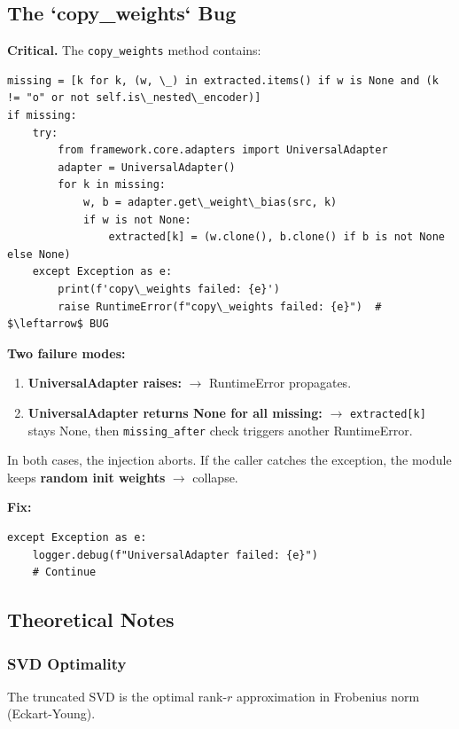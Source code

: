 \subsection{The `copy\_weights` Bug}

\textbf{Critical.} The \texttt{copy\_weights} method contains:

\begin{lstlisting}
missing = [k for k, (w, \_) in extracted.items() if w is None and (k != "o" or not self.is\_nested\_encoder)]
if missing:
    try:
        from framework.core.adapters import UniversalAdapter
        adapter = UniversalAdapter()
        for k in missing:
            w, b = adapter.get\_weight\_bias(src, k)
            if w is not None:
                extracted[k] = (w.clone(), b.clone() if b is not None else None)
    except Exception as e:
        print(f'copy\_weights failed: {e}')
        raise RuntimeError(f"copy\_weights failed: {e}")  # $\leftarrow$ BUG
\end{lstlisting}

\textbf{Two failure modes:}

\begin{enumerate}
\item \textbf{UniversalAdapter raises:} $\to$ RuntimeError propagates.
\item \textbf{UniversalAdapter returns None for all missing:} $\to$ \texttt{extracted[k]} stays None, then \texttt{missing\_after} check triggers another RuntimeError.

\end{enumerate}
In both cases, the injection aborts. If the caller catches the exception, 
the module keeps \textbf{random init weights} $\to$ collapse.

\textbf{Fix:}

\begin{lstlisting}
except Exception as e:
    logger.debug(f"UniversalAdapter failed: {e}")
    # Continue
\end{lstlisting}

\subsection{Theoretical Notes}

\subsubsection{SVD Optimality}

The truncated SVD is the optimal rank-$r$ approximation in Frobenius norm 
(Eckart-Young).

